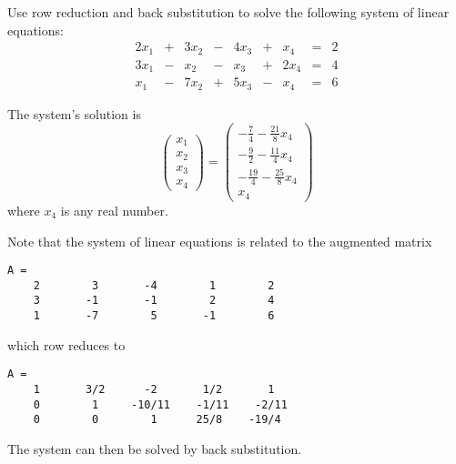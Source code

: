\documentclass{ximera}
\begin{document}
\begin{exercise} \label{c2.3.3}
Use row reduction and back substitution to solve the following
system of linear equations:
\[
\begin{array}{rcrcrcrcr}
2x_1 & + &  3x_2 &  - &  4x_3 & + &  x_4 &  = & 2 \\
3x_1 & - &   x_2 &  - &   x_3 & + & 2x_4 &  = & 4 \\
 x_1 & - &  7x_2 &  + &  5x_3 & - &  x_4 &  = & 6
\end{array}
\]

\begin{solution}

\ans The system's solution is
\[
\left(\begin{array}{c} x_1 \\ x_2 \\ x_3 \\ x_4\end{array}\right) =
\left(\begin{array}{c} -\frac{7}{4} - \frac{21}{8}x_4 \\ -\frac{9}{2} -
\frac{11}{4}x_4 \\ -\frac{19}{4} - \frac{25}{8}x_4 \\ x_4\end{array}\right)
\]
where $x_4$ is any real number.

\soln Note that the system of linear equations is related to the
augmented matrix
\begin{verbatim}
A = 
    2        3       -4        1        2
    3       -1       -1        2        4
    1       -7        5       -1        6
\end{verbatim}
which row reduces to
\begin{verbatim}
A =
    1       3/2      -2       1/2       1
    0        1     -10/11    -1/11    -2/11
    0        0        1      25/8    -19/4
\end{verbatim}
The system can then be solved by back substitution.

\end{solution}
\end{exercise}
\end{document}

